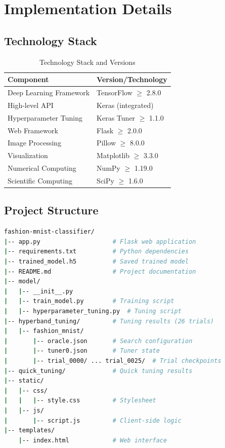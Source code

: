 \documentclass[12pt,a4paper]{article}
\begin{document}
\section{Implementation Details}

\subsection{Technology Stack}

\begin{table}[H]
\centering
\caption{Technology Stack and Versions}
\begin{tabular}{ll}
\toprule
\textbf{Component} & \textbf{Version/Technology} \\
\midrule
Deep Learning Framework & TensorFlow $\geq$ 2.8.0 \\
High-level API & Keras (integrated) \\
Hyperparameter Tuning & Keras Tuner $\geq$ 1.1.0 \\
Web Framework & Flask $\geq$ 2.0.0 \\
Image Processing & Pillow $\geq$ 8.0.0 \\
Visualization & Matplotlib $\geq$ 3.3.0 \\
Numerical Computing & NumPy $\geq$ 1.19.0 \\
Scientific Computing & SciPy $\geq$ 1.6.0 \\
\bottomrule
\end{tabular}
\end{table}

\subsection{Project Structure}

\begin{lstlisting}[language=bash, caption={Project Directory Structure}]
fashion-mnist-classifier/
|-- app.py                    # Flask web application
|-- requirements.txt          # Python dependencies
|-- trained_model.h5          # Saved trained model
|-- README.md                 # Project documentation
|-- model/
|   |-- __init__.py
|   |-- train_model.py        # Training script
|   |-- hyperparameter_tuning.py  # Tuning script
|-- hyperband_tuning/         # Tuning results (26 trials)
|   |-- fashion_mnist/
|       |-- oracle.json       # Search configuration
|       |-- tuner0.json       # Tuner state
|       |-- trial_0000/ ... trial_0025/  # Trial checkpoints
|-- quick_tuning/             # Quick tuning results
|-- static/
|   |-- css/
|   |   |-- style.css         # Stylesheet
|   |-- js/
|       |-- script.js         # Client-side logic
|-- templates/
    |-- index.html            # Web interface
\end{lstlisting}
\end{document}
